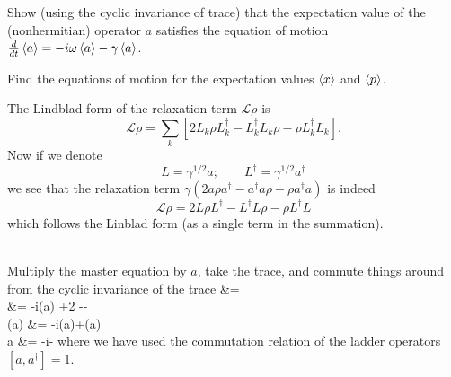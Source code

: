 \documentclass[10pt,letterpaper]{article}
\begin{document}
	\item
	Show (using the cyclic invariance of trace) that the expectation value of the (nonhermitian) operator $a$ 
	satisfies the equation of motion $\frac{d}{dt}\braket a = -i\omega \braket a - \gamma \braket a$.
	
	\item
	Find the equations of motion for the expectation values $\braket x$ and $\braket p$.  \\
	\eenum 
	\benum
	\item
	The Lindblad form of the relaxation term $\mathcal L\rho$ is
	\[
		\mathcal L\rho = \sum_k[2L_k\rho L_k^\dag-L_k^\dag L_k\rho -\rho L_k^\dag L_k].
	\]
	Now if we denote
	\[
		L = \gamma^{1/2}a;\qquad L^\dag = \gamma^{1/2} a^\dag
	\]
	we see that the relaxation term $ \gamma(2a\rho a^\dag - a^\dag a\rho - \rho a^\dag a)$ is indeed 
	\[
		\mathcal L\rho = 2L\rho L^\dag-L^\dag L\rho -\rho L^\dag L
	\]
	which follows the Linblad form (as a single term in the summation). 
	\\ \\
	\item
	Multiply the master equation by $a$, take the trace, and commute things around from the cyclic invariance of the trace
	\ba
		\tr{} &= \tr{}\\
		 \tr{} &= -i\omega \tr(\rho[a,a^\dag]a)
		 +2\gamma\tr{} -\gamma\tr{}-\gamma\tr{}\\
		 \tr(\rho a) &= -i\omega\tr(\rho a)+\gamma\tr(\rho[a^\dag,a]a) \\
		 \braket a &= -i\omega {}-\gamma{}
	\ea
	where we have used the commutation relation of the ladder operators $[a,a^\dag] = 1$. \\ \\
	
\end{document}
